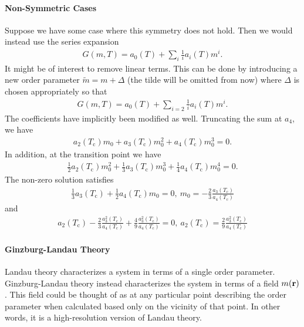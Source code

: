 \paragraph{Non-Symmetric Cases}
Suppose we have some case where this symmetry does not hold. Then we would instead use the series expansion
\begin{align*}
	G(m, T) = a_{0}(T) + \sum\limits_{i}\frac{1}{i}a_{i}(T)m^{i}.
\end{align*}
It might be of interest to remove linear terms. This can be done by introducing a new order parameter $\tilde{m} = m + \Delta$ (the tilde will be omitted from now) where $\Delta$ is chosen appropriately so that
\begin{align*}
	G(m, T) = a_{0}(T) + \sum\limits_{i = 2}\frac{1}{i}a_{i}(T)m^{i}.
\end{align*}
The coefficients have implicitly been modified as well. Truncating the sum at $a_{4}$, we have
\begin{align*}
	a_{2}(T_{\text{c}})m_{0} + a_{3}(T_{\text{c}})m_{0}^{2} + a_{4}(T_{\text{c}})m_{0}^{3} = 0.
\end{align*}
In addition, at the transition point we have
\begin{align*}
	\frac{1}{2}a_{2}(T_{\text{c}})m_{0}^{2} + \frac{1}{3}a_{3}(T_{\text{c}})m_{0}^{3} + \frac{1}{4}a_{4}(T_{\text{c}})m_{0}^{4} = 0.
\end{align*}
The non-zero solution satisfies
\begin{align*}
	\frac{1}{3}a_{3}(T_{\text{c}}) + \frac{1}{2}a_{4}(T_{\text{c}})m_{0} = 0,\ m_{0} = -\frac{2}{3}\frac{a_{3}(T_{\text{c}})}{a_{4}(T_{\text{c}})}
\end{align*}
and
\begin{align*}
	a_{2}(T_{\text{c}}) - \frac{2}{3}\frac{a_{3}^{2}(T_{\text{c}})}{a_{4}(T_{\text{c}})} + \frac{4}{9}\frac{a_{3}^{2}(T_{\text{c}})}{a_{4}(T_{\text{c}})} = 0,\ a_{2}(T_{\text{c}}) = \frac{2}{9}\frac{a_{3}^{2}(T_{\text{c}})}{a_{4}(T_{\text{c}})}
\end{align*}

\paragraph{Ginzburg-Landau Theory}
Landau theory characterizes a system in terms of a single order parameter. Ginzburg-Landau theory instead characterizes the system in terms of a field $m(\vb{r})$. This field could be thought of as at any particular point describing the order parameter when calculated based only on the vicinity of that point. In other words, it is a high-resolution version of Landau theory.

